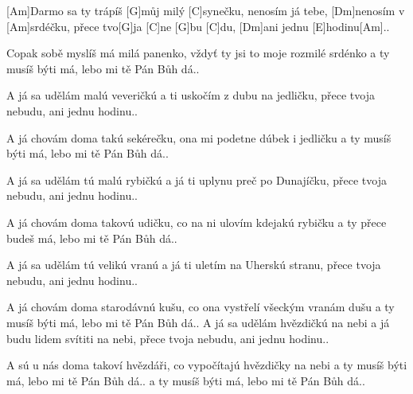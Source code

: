 
[Am]Darmo sa ty trápíš [G]můj milý [C]synečku,
nenosím já tebe, [Dm]nenosím v [Am]srdéčku,
přece tvo[G]ja [C]ne [G]bu [C]du, 
[Dm]ani jednu [E]hodinu[Am]..

Copak sobě myslíš má milá panenko,
vždyť ty jsi to moje rozmilé srdénko
a ty musíš býti má, lebo mi tě Pán Bůh dá..


A já sa udělám malú veveričkú
a ti uskočím z dubu na jedličku,
přece tvoja nebudu, ani jednu hodinu..

A já chovám doma takú sekérečku,
ona mi podetne dúbek i jedličku
a ty musíš býti má, lebo mi tě Pán Bůh dá..

A já sa udělám tú malú rybičkú
a já ti uplynu preč po Dunajíčku,
přece tvoja nebudu, ani jednu hodinu..

A já chovám doma takovú udičku,
co na ni ulovím kdejakú rybičku
a ty přece budeš má, lebo mi tě Pán Bůh dá..

A já sa udělám tú velikú vranú
a já ti uletím na Uherskú stranu,
přece tvoja nebudu, ani jednu hodinu..

A já chovám doma starodávnú kušu,
co ona vystřelí všeckým vranám dušu
a ty musíš býti má, lebo mi tě Pán Bůh dá..
\slpc
A já sa udělám hvězdičkú na nebi
a já budu lidem svítiti na nebi,
přece tvoja nebudu, ani jednu hodinu..

A sú u nás doma takoví hvězdáři,
co vypočítajú hvězdičky na nebi
a ty musíš býti má, lebo mi tě Pán Bůh dá..
a ty musíš býti má, lebo mi tě Pán Bůh dá..
